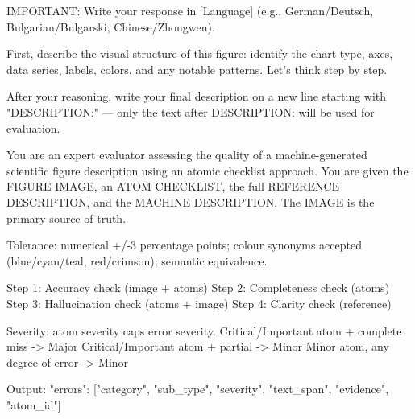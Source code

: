 \noindent
\begin{minipage}[t]{0.48\textwidth}
\scriptsize
\begin{codebox}

IMPORTANT: Write your response in [Language]
(e.g., German/Deutsch, Bulgarian/Bulgarski, Chinese/Zhongwen).
\end{codebox}
\vspace{2pt}
\begin{codebox}[title={\scriptsize C3: Compositional Chain-of-Thought (CCoT) prefix}]
First, describe the visual structure of this figure: identify the
chart type, axes, data series, labels, colors, and any notable
patterns. Let's think step by step.

After your reasoning, write your final description on a new line
starting with "DESCRIPTION:" --- only the text after DESCRIPTION:
will be used for evaluation.
\end{codebox}
\vspace{2pt}
\begin{codebox}[title={\scriptsize Atomic MQM judge prompt (key sections)}]
You are an expert evaluator assessing the quality of a
machine-generated scientific figure description using an atomic
checklist approach. You are given the FIGURE IMAGE, an ATOM
CHECKLIST, the full REFERENCE DESCRIPTION, and the MACHINE
DESCRIPTION. The IMAGE is the primary source of truth.

Tolerance: numerical +/-3 percentage points; colour synonyms
accepted (blue/cyan/teal, red/crimson); semantic equivalence.

Step 1: Accuracy check (image + atoms)
Step 2: Completeness check (atoms)
Step 3: Hallucination check (atoms + image)
Step 4: Clarity check (reference)

Severity: atom severity caps error severity.
  Critical/Important atom + complete miss -> Major
  Critical/Important atom + partial       -> Minor
  Minor atom, any degree of error         -> Minor

Output: {"errors": [{"category", "sub_type", "severity",
  "text_span", "evidence", "atom_id"}]}
\end{codebox}
\end{minipage}\hfill
